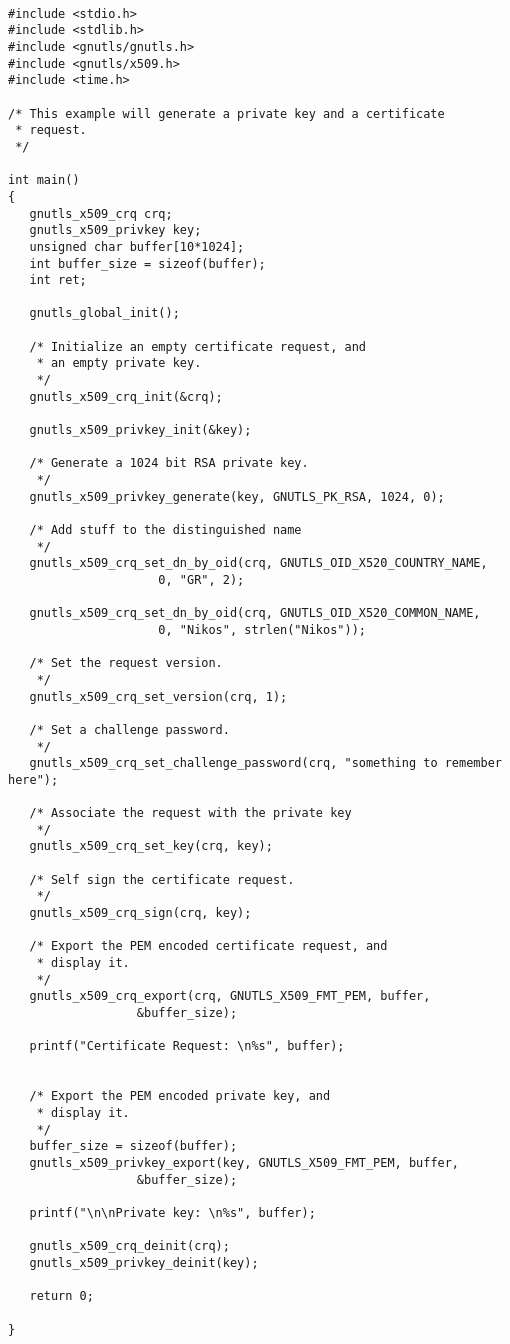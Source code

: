 \begin{verbatim}

#include <stdio.h>
#include <stdlib.h>
#include <gnutls/gnutls.h>
#include <gnutls/x509.h>
#include <time.h>

/* This example will generate a private key and a certificate
 * request.
 */

int main()
{
   gnutls_x509_crq crq;
   gnutls_x509_privkey key;
   unsigned char buffer[10*1024];
   int buffer_size = sizeof(buffer);
   int ret;

   gnutls_global_init();

   /* Initialize an empty certificate request, and
    * an empty private key.
    */
   gnutls_x509_crq_init(&crq);

   gnutls_x509_privkey_init(&key);

   /* Generate a 1024 bit RSA private key.
    */
   gnutls_x509_privkey_generate(key, GNUTLS_PK_RSA, 1024, 0);

   /* Add stuff to the distinguished name
    */
   gnutls_x509_crq_set_dn_by_oid(crq, GNUTLS_OID_X520_COUNTRY_NAME,
				     0, "GR", 2);

   gnutls_x509_crq_set_dn_by_oid(crq, GNUTLS_OID_X520_COMMON_NAME,
				     0, "Nikos", strlen("Nikos"));

   /* Set the request version.
    */
   gnutls_x509_crq_set_version(crq, 1);

   /* Set a challenge password.
    */
   gnutls_x509_crq_set_challenge_password(crq, "something to remember here");

   /* Associate the request with the private key
    */
   gnutls_x509_crq_set_key(crq, key);

   /* Self sign the certificate request.
    */
   gnutls_x509_crq_sign(crq, key);

   /* Export the PEM encoded certificate request, and
    * display it.
    */
   gnutls_x509_crq_export(crq, GNUTLS_X509_FMT_PEM, buffer,
			      &buffer_size);

   printf("Certificate Request: \n%s", buffer);


   /* Export the PEM encoded private key, and
    * display it.
    */
   buffer_size = sizeof(buffer);
   gnutls_x509_privkey_export(key, GNUTLS_X509_FMT_PEM, buffer,
				  &buffer_size);

   printf("\n\nPrivate key: \n%s", buffer);

   gnutls_x509_crq_deinit(crq);
   gnutls_x509_privkey_deinit(key);

   return 0;

}

\end{verbatim}
